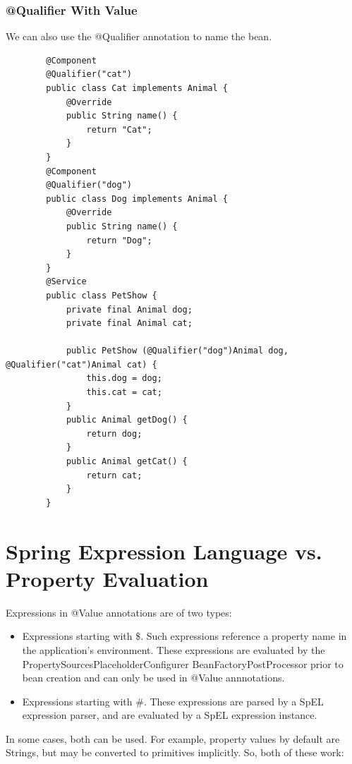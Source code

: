 \documentclass{scrartcl}
\begin{document}
\subsubsection{@Qualifier With Value}
    We can also use the @Qualifier annotation to name the bean.

    \begin{lstlisting}
        @Component
        @Qualifier("cat")
        public class Cat implements Animal {
            @Override
            public String name() {
                return "Cat";
            }
        }
        @Component
        @Qualifier("dog")
        public class Dog implements Animal {
            @Override
            public String name() {
                return "Dog";
            }
        }
        @Service
        public class PetShow {
            private final Animal dog;
            private final Animal cat;

            public PetShow (@Qualifier("dog")Animal dog, @Qualifier("cat")Animal cat) {
                this.dog = dog;
                this.cat = cat;
            }
            public Animal getDog() {
                return dog;
            }
            public Animal getCat() {
                return cat;
            }
        }
        \end{lstlisting}

\section{Spring Expression Language vs. Property Evaluation}

    Expressions in @Value annotations are of two types:

    \begin{itemize}
        \item Expressions starting with \$. Such expressions reference a property name in the application’s environment. These expressions are evaluated by the PropertySourcesPlaceholderConfigurer BeanFactoryPostProcessor prior to bean creation and can only be used in @Value annnotations.
        \item Expressions starting with \#.
        These expressions are parsed by a SpEL expression parser, and are evaluated by a SpEL expression instance.
    \end{itemize}

    In some cases, both can be used. For example, property values by default are Strings, but may be converted to primitives implicitly. So, both of these work:
\end{document}
